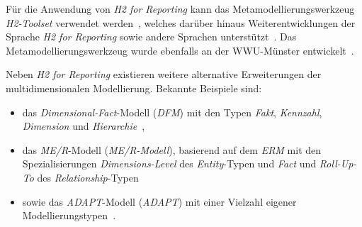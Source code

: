 \documentclass[
  language=german, %
  type=bachelor,%
  ngerman
]{isthesis}
\begin{document}
\begin{content}
\begin{itemize}
	\end{itemize}

	Für die Anwendung von \textit{H2 for Reporting} kann das
	Metamodellierungswerkzeug \textit{H2-Toolset} verwendet werden~\cite[][S.
	33]{fleischer2013konstruktion}, welches darüber hinaus Weiterentwicklungen
	der Sprache \textit{H2 for Reporting} sowie andere Sprachen
	unterstützt~\cite[][S. 86]{becker2012fachkonzeptionelle}. Das
	Metamodellierungswerkzeug wurde ebenfalls an der \acrshort{WWU}-Münster
	entwickelt~\cite[][S.  34]{becker2007h2}.

	Neben \textit{H2 for Reporting} existieren weitere alternative Erweiterungen
	der multidimensionalen Modellierung. Bekannte Beispiele sind:

  \begin{itemize}
    \item das \textit{Dimensional-Fact}-Modell (\textit{\acrshort{DFM}}) mit den Typen
      \textit{Fakt}, \textit{Kennzahl}, \textit{Dimension} und
      \textit{Hierarchie}~\cite[][]{golfarelli1998dimensional}, 
    \item das \textit{\acrlong{ME/R}}-Modell (\textit{\acrshort{ME/R}-Modell}), basierend
      auf dem \textit{\acrlong{ERM}} mit den Spezialisierungen
      \textit{Dimensions-Level} des \textit{Entity}-Typen und \textit{Fact} und
      \textit{Roll-Up-To} des
      \textit{Relationship}-Typen~\cite[][]{sapia1998extending}
    \item sowie das
      \textit{\acrlong{ADAPT}}-Modell (\textit{\acrshort{ADAPT}}) mit einer
      Vielzahl eigener Modellierungstypen~\cite[][]{chamoni2013analytische}.
  \end{itemize}





\end{content}
\end{document}
